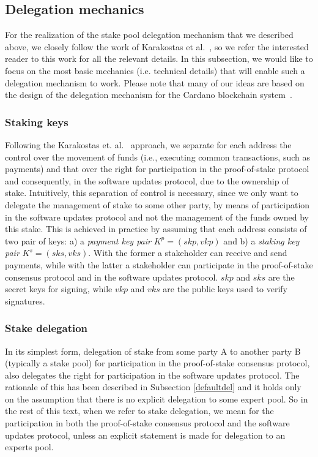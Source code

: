 \documentclass[11pt,a4paper]{article}
\begin{document}
\subsection{Delegation mechanics}
\label{sec:delegation-mechanics}

For the realization of the stake pool delegation mechanism that we described
above, we closely follow the work of Karakostas et al.~\cite{stakepools}, so we
refer the interested reader to this work for all the relevant details.
%
In this subsection, we would like to focus on the most basic mechanics (i.e.
technical details) that will enable such a delegation mechanism to work. Please
note that many of our ideas are based on the design of the delegation mechanism
for the Cardano blockchain system~\cite{deldesign}.

\subsubsection{Staking keys}
\label{sec:staking-keys}

Following the Karakostas et. al.~\cite{stakepools} approach, we separate for
each address the control over the movement of funds (i.e., executing common
transactions, such as payments) and that over the right for participation in the
proof-of-stake protocol and consequently, in the software updates protocol, due
to the ownership of stake.
%
Intuitively, this separation of control is necessary, since we only want to
delegate the management of stake to some other party, by means of participation
in the software updates protocol and not the management of the funds owned by
this stake. This is achieved in practice by assuming that each address consists
of two pair of keys: a) a \emph{payment key pair} $K^p = (skp,vkp)$ and b) a
\emph{staking key pair} $K^s = (sks, vks)$. With the former a stakeholder can
receive and send payments, while with the latter a stakeholder can participate
in the proof-of-stake consensus protocol and in the software updates protocol.
$skp$ and $sks$ are the secret keys for signing, while $vkp$ and $vks$ are the
public keys used to verify signatures.

\subsubsection{Stake delegation}
\label{sec:stake-delegation}

In its simplest form, delegation of stake from some party A to another party B
(typically a stake pool) for participation in the proof-of-stake consensus
protocol, also delegates the right for participation in the software updates
protocol.
%
The rationale of this has been described in Subsection \ref{defaultdel} and it
holds only on the assumption that there is no explicit delegation to some expert
pool. So in the rest of this text, when we refer to stake delegation, we mean
for the participation in both the proof-of-stake consensus protocol and the
software updates protocol, unless an explicit statement is made for delegation
to an experts pool.
\end{document}

